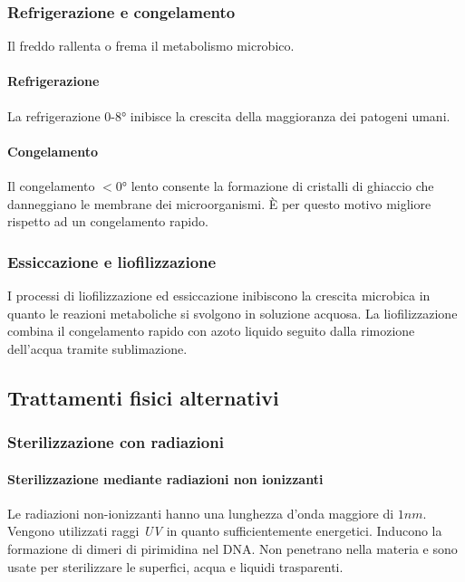 		\subsubsection{Refrigerazione e congelamento}
		Il freddo rallenta o frema il metabolismo microbico.
			
			\paragraph{Refrigerazione}
			La refrigerazione $0$-$8\si{\degree}$ inibisce la crescita della maggioranza dei patogeni umani.

			\paragraph{Congelamento}
			Il congelamento $<0\si{\degree}$ lento consente la formazione di cristalli di ghiaccio che danneggiano le membrane dei microorganismi.
			\`E per questo motivo migliore rispetto ad un congelamento rapido.

		\subsubsection{Essiccazione e liofilizzazione}
		I processi di liofilizzazione ed essiccazione inibiscono la crescita microbica in quanto le reazioni metaboliche si svolgono in soluzione acquosa.
		La liofilizzazione combina il congelamento rapido con azoto liquido seguito dalla rimozione dell'acqua tramite sublimazione.

	\subsection{Trattamenti fisici alternativi}

		\subsubsection{Sterilizzazione con radiazioni}

			\paragraph{Sterilizzazione mediante radiazioni non ionizzanti}
			Le radiazioni non-ionizzanti hanno una lunghezza d'onda maggiore di $1 nm$.
			Vengono utilizzati raggi \emph{UV} in quanto sufficientemente energetici.
			Inducono la formazione di dimeri di pirimidina nel DNA.
			Non penetrano nella materia e sono usate per sterilizzare le superfici, acqua e liquidi trasparenti.

